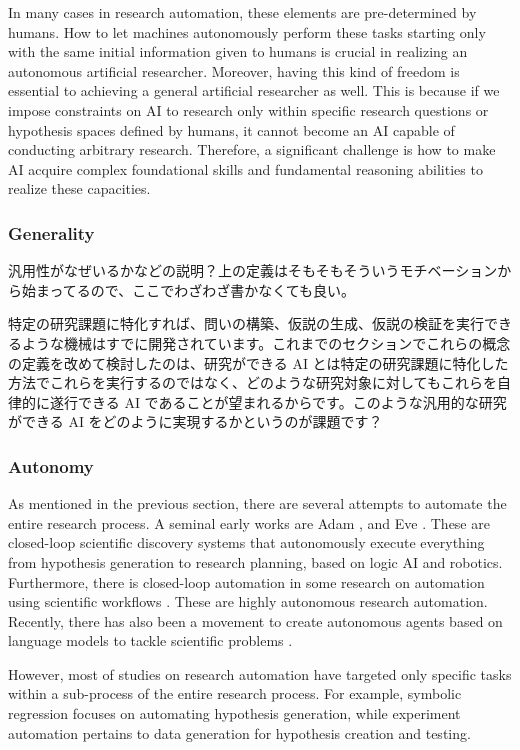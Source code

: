 In many cases in research automation, these elements are pre-determined by humans. How to let machines autonomously perform these tasks starting only with the same initial information given to humans is crucial in realizing an autonomous artificial researcher. Moreover, having this kind of freedom is essential to achieving a general artificial researcher as well. This is because if we impose constraints on AI to research only within specific research questions or hypothesis spaces defined by humans, it cannot become an AI capable of conducting arbitrary research. Therefore, a significant challenge is how to make AI acquire complex foundational skills and fundamental reasoning abilities to realize these capacities.

\subsubsection{Generality}
汎用性がなぜいるかなどの説明？上の定義はそもそもそういうモチベーションから始まってるので、ここでわざわざ書かなくても良い。

特定の研究課題に特化すれば、問いの構築、仮説の生成、仮説の検証を実行できるような機械はすでに開発されています。これまでのセクションでこれらの概念の定義を改めて検討したのは、研究ができる AI とは特定の研究課題に特化した方法でこれらを実行するのではなく、どのような研究対象に対してもこれらを自律的に遂行できる AI であることが望まれるからです。このような汎用的な研究ができる AI をどのように実現するかというのが課題です？

\subsubsection{Autonomy}
As mentioned in the previous section, there are several attempts to automate the entire research process. A seminal early works are Adam \cite{king2004functional}, and Eve \cite{williams2015cheaper}. These are closed-loop scientific discovery systems that autonomously execute everything from hypothesis generation to research planning, based on logic AI and robotics. Furthermore, there is closed-loop automation in some research on automation using scientific workflows \cite{gil2017towards}. These are highly autonomous research automation. Recently, there has also been a movement to create autonomous agents based on language models to tackle scientific problems \cite{wang2023survey}.

However, most of studies on research automation have targeted  only specific tasks within a sub-process of the entire research process. For example, symbolic regression focuses on automating hypothesis generation, while experiment automation pertains to data generation for hypothesis creation and testing.


